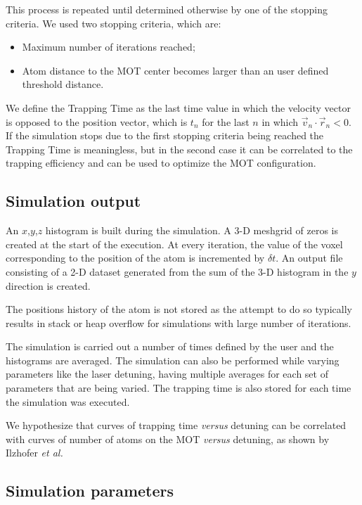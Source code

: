 \documentclass[12pt,a4paper,twoside]{article}
\begin{document}
This process is repeated until determined otherwise by one of the stopping criteria. We used two stopping criteria, which are:

\begin{itemize}
	\item Maximum number of iterations reached;
	\item Atom distance to the MOT center becomes larger than an user defined threshold distance.
\end{itemize}

We define the Trapping Time as the last time value in which the velocity vector is opposed to the position vector, which is $t_n$ for the last $n$ in which $\vec{v}_n\cdot\vec{r}_n < 0$. If the simulation stops due to the first stopping criteria being reached the Trapping Time is meaningless, but in the second case it can be correlated to the trapping efficiency and can be used to optimize the MOT configuration.


\subsection{Simulation output}

An $x$,$y$,$z$ histogram is built during the simulation. A 3-D meshgrid of zeros is created at the start of the execution. At every iteration, the value of the voxel corresponding to the position of the atom is incremented by $\delta t$. An output file consisting of a 2-D dataset generated from the sum of the 3-D histogram in the $y$ direction is created.

The positions history of the atom is not stored as the attempt to do so typically results in stack or heap overflow for simulations with large number of iterations.

The simulation is carried out a number of times defined by the user and the histograms are averaged. The simulation can also be performed while varying parameters like the laser detuning, having multiple averages for each set of parameters that are being varied. The trapping time is also stored for each time the simulation was executed.

We hypothesize that curves of trapping time \textit{versus} detuning can be correlated with curves of number of atoms on the MOT \textit{versus} detuning, as shown by Ilzhofer \textit{et al.}\cite{ilzhofer2018two}


\subsection{Simulation parameters}
\end{document}
